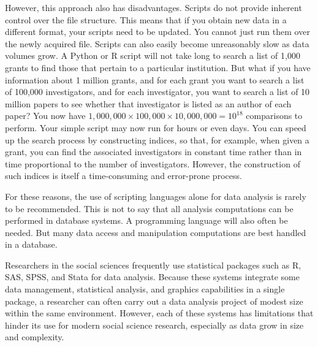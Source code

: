 \documentclass[]{krantz}
\begin{document}
However, this approach also has disadvantages. Scripts do not provide
inherent control over the file structure. This means that if you obtain
new data in a different format, your scripts need to be updated. You
cannot just run them over the newly acquired file. Scripts can also
easily become unreasonably slow as data volumes grow. A Python or R
script will not take long to search a list of 1,000 grants to find those
that pertain to a particular institution. But what if you have
information about 1 million grants, and for each grant you want to
search a list of 100,000 investigators, and for each investigator, you
want to search a list of 10 million papers to see whether that
investigator is listed as an author of each paper? You now have
\(1{,}000{,}000 \times 100{,}000 \times 10{,}000{,}000 = 10^{18}\)
comparisons to perform. Your simple script may now run for hours or even
days. You can speed up the search process by constructing indices, so
that, for example, when given a grant, you can find the associated
investigators in constant time rather than in time proportional to the
number of investigators. However, the construction of such indices is
itself a time-consuming and error-prone process.

For these reasons, the use of scripting languages alone for data
analysis is rarely to be recommended. This is not to say that all
analysis computations can be performed in database systems. A
programming language will also often be needed. But many data access and
manipulation computations are best handled in a database.

Researchers in the social sciences frequently use statistical packages
such as R, SAS, SPSS, and Stata for data analysis. Because these systems
integrate some data management, statistical analysis, and graphics
capabilities in a single package, a researcher can often carry out a
data analysis project of modest size within the same environment.
However, each of these systems has limitations that hinder its use for
modern social science research, especially as data grow in size and
complexity.
\end{document}
